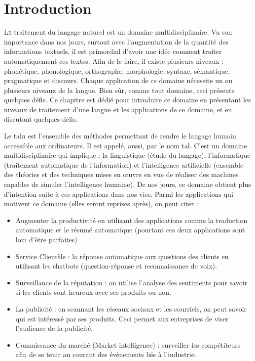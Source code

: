 \documentclass{KodeBook}
\begin{document}
		\mainmatter
	
\fi
\chapter{Introduction}

\begin{introduction}
	\lettrine{L}{e} traitement du langage naturel est un domaine multidisciplinaire. 
	Vu son importance dans nos jours, surtout avec l'augmentation de la quantité des informations textuels, il est primordial d'avoir une idée comment traiter automatiquement ces textes. 
	Afin de le faire, il existe plusieurs niveaux : phonétique, phonologique, orthographe, morphologie, syntaxe, sémantique, pragmatique et discours. 
	Chaque application de ce domaine nécessite un ou plusieurs niveaux de la langue. 
	Bien sûr, comme tout domaine, ceci présente quelques défis. 
	Ce chapitre est dédié pour introduire ce domaine en présentant les niveaux de traitement d'une langue et les applications de ce domaine, et en discutant quelques défis.
\end{introduction} 

Le \ac{taln} est l'ensemble des méthodes permettant de rendre le langage humain accessible aux ordinateurs.
Il est appelé, aussi, par le nom \ac{tal}. 
C'est un domaine multidisciplinaire qui implique : la linguistique (étude du langage), l'informatique (traitement automatique de l'information) et l'intelligence artificielle (ensemble des théories et des techniques mises en œuvre en vue de réaliser des machines capables de simuler l'intelligence humaine).
De nos jours, ce domaine obtient plus d'intention suite à ces applications dans nos vies. 
Parmi les applications qui motivent ce domaine (elles seront reprises après), on peut citer :
\begin{itemize}
	\item Augmenter la productivité en utilisant des applications comme la traduction automatique et le résumé automatique (pourtant ces deux applications sont loin d'être parfaites)
	
	\item Service Clientèle : la réponse automatique aux questions des clients en utilisant les chatbots (question-réponse et reconnaissance de voix). 
	
	\item Surveillance de la réputation : on utilise l'analyse des sentiments pour savoir si les clients sont heureux avec ses produits ou non. 
	
	\item La publicité : en scannant les réseaux sociaux et les courriels, on peut savoir qui est intéressé par ses produits. Ceci permet aux entreprises de viser l'audience de la publicité. 
	
	\item Connaissance du marché (Market intelligence) : surveiller les compétiteurs afin de se tenir au courant des évènements liés à l'industrie.
\end{itemize}
\end{document}
